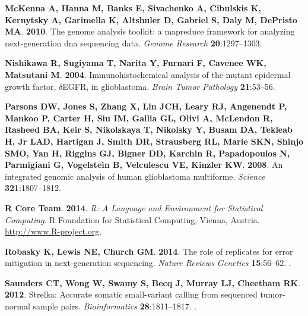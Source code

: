 \documentclass[11 pt]{article} %
\begin{document}
\begin{thebibliography}{31}
\textbf{McKenna A, Hanna M, Banks E, Sivachenko A, Cibulskis K, Kernytsky A,
  Garimella K, Altshuler D, Gabriel S, Daly M, DePristo MA}. \textbf{2010}.
\newblock The genome analysis toolkit: a mapreduce framework for analyzing
  next-generation dna sequencing data.
\newblock \emph{Genome Research} \textbf{20}:1297--1303.

\textbf{Nishikawa R, Sugiyama T, Narita Y, Furnari F, Cavenee WK, Matsutani M}.
  \textbf{2004}.
\newblock Immunohistochemical analysis of the mutant epidermal growth factor,
  $\delta${EGFR}, in glioblastoma.
\newblock \emph{Brain Tumor Pathology} \textbf{21}:53--56.

\textbf{Parsons DW, Jones S, Zhang X, Lin JCH, Leary RJ, Angenendt P, Mankoo P,
  Carter H, Siu IM, Gallia GL, Olivi A, McLendon R, Rasheed BA, Keir S,
  Nikolskaya T, Nikolsky Y, Busam DA, Tekleab H, Jr LAD, Hartigan J, Smith DR,
  Strausberg RL, Marie SKN, Shinjo SMO, Yan H, Riggins GJ, Bigner DD, Karchin
  R, Papadopoulos N, Parmigiani G, Vogelstein B, Velculescu VE, Kinzler KW}.
  \textbf{2008}.
\newblock An integrated genomic analysis of human glioblastoma multiforme.
\newblock \emph{Science} \textbf{321}:1807--1812.

\textbf{{R Core Team}}. \textbf{2014}.
\newblock \emph{R: A Language and Environment for Statistical Computing}.
\newblock R Foundation for Statistical Computing, Vienna, Austria.
\newblock \urlprefix\url{http://www.R-project.org}.

\textbf{Robasky K, Lewis NE, Church GM}. \textbf{2014}.
\newblock The role of replicates for error mitigation in next-generation
  sequencing.
\newblock \emph{Nature Reviews Genetics} \textbf{15}:56--62.
\newblock {}.

\textbf{Saunders CT, Wong W, Swamy S, Becq J, Murray LJ, Cheetham RK}.
  \textbf{2012}.
\newblock Strelka: Accurate somatic small-variant calling from sequenced
  tumor-normal sample pairs.
\newblock \emph{Bioinformatics} \textbf{28}:1811--1817.
\newblock {}.


\end{thebibliography}
\end{document}
